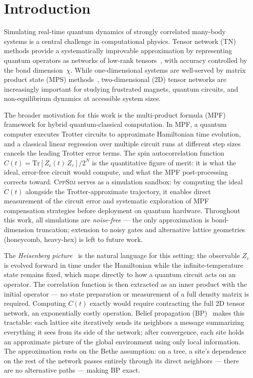 \documentclass[11pt]{article}
\begin{document}
\section{Introduction}
\label{sec:intro}

Simulating real-time quantum dynamics of strongly correlated many-body systems is
a central challenge in computational physics. Tensor network (TN) methods provide
a systematically improvable approximation by representing quantum operators as
networks of low-rank tensors~\citep{orus2014practical}, with accuracy controlled
by the bond dimension~$\chi$. While one-dimensional systems are well-served by
matrix product state (MPS) methods~\citep{vidal2003efficient}, two-dimensional
(2D) tensor networks are increasingly important for studying frustrated magnets,
quantum circuits, and non-equilibrium dynamics at accessible system sizes.

The broader motivation for this work is the multi-product formula (MPF)
framework for hybrid quantum-classical computation. In MPF, a quantum computer
executes Trotter circuits to approximate Hamiltonian time evolution, and a
classical linear regression over multiple circuit runs at different step sizes
cancels the leading Trotter error terms. The spin autocorrelation function
$C(t) = \mathrm{Tr}[Z_c(t)\,Z_c]/2^N$ is the quantitative figure of merit:
it is what the ideal, error-free circuit would compute, and what the MPF
post-processing corrects toward. \textsc{CppSim} serves as a simulation sandbox: by computing the
ideal $C(t)$ alongside the Trotter-approximate trajectory, it enables
direct measurement of the circuit error and systematic exploration of
MPF compensation strategies before deployment on quantum hardware.
Throughout this work, all simulations are \emph{noise-free} ---
the only approximation is bond-dimension truncation; extension to
noisy gates and alternative lattice geometries (honeycomb, heavy-hex)
is left to future work.

The \emph{Heisenberg picture}~\citep{rudolph2025simulating} is the natural
language for this setting: the observable $Z_c$ is evolved forward in time
under the Hamiltonian while the infinite-temperature state remains fixed,
which maps directly to how a quantum circuit acts on an operator.
The correlation function is then extracted as an inner product with the
initial operator — no state preparation or measurement of a full density
matrix is required.
Computing $C(t)$ exactly would require contracting the full 2D tensor
network, an exponentially costly operation.
Belief propagation (BP)~\citep{tindall2023gauging} makes this tractable:
each lattice site iteratively sends its neighbors a message summarizing
everything it sees from its side of the network; after convergence, each
site holds an approximate picture of the global environment using only
local information.
The approximation rests on the Bethe assumption: on a tree, a site's
dependence on the rest of the network passes entirely through its direct
neighbors — there are no alternative paths — making BP exact.
\end{document}
